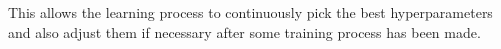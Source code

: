 \documentclass[12pt,onecolumn,oneside,titlepage]{article}
\begin{document}
This allows the learning process to continuously pick the best hyperparameters and also adjust them if necessary after some training process has been made.





\end{document}
